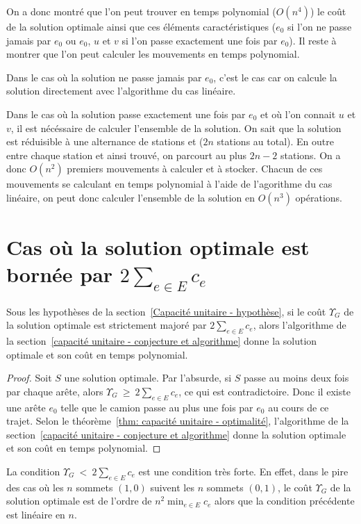 On a donc montré que l'on peut trouver en temps polynomial ($O(n^4)$) le coût de la solution optimale ainsi que ces éléments caractéristiques ($e_0$ si l'on ne passe jamais par $e_0$ ou $e_0$, $u$ et $v$ si l'on passe exactement une fois par $e_0$). Il reste à montrer que l'on peut calculer les mouvements en temps polynomial.

Dans le cas où la solution ne passe jamais par $e_0$, c'est le cas car on calcule la solution directement avec l'algorithme du cas linéaire.

Dans le cas où la solution passe exactement une fois par $e_0$ et où l'on connait $u$ et $v$, il est nécéssaire de calculer l'ensemble de la solution. On sait que la solution est réduisible à une alternance de stations \plus et \moins ($2n$ stations au total). En outre entre chaque station \plus et \moins ainsi trouvé, on parcourt au plus $2n-2$ stations. On a donc $O(n^2)$ premiers mouvements à calculer et à stocker. Chacun de ces mouvements se calculant en temps polynomial à l'aide de l'agorithme du cas linéaire, on peut donc calculer l'ensemble de la solution en $O(n^3)$ opérations.


\section{Cas où la solution optimale est bornée par $2\sum_{e \in E}c_e$}

\begin{prop}
Sous les hypothèses de la section~\ref{Capacité unitaire - hypothèse}, si le coût $\Upsilon_G$ de la solution optimale est strictement majoré par $2\sum_{e \in E}c_e$, alors l'algorithme de la section~\ref{capacité unitaire - conjecture et algorithme} donne la solution optimale et son coût en temps polynomial.
\end{prop}

\begin{proof}
Soit $S$ une solution optimale. Par l'absurde, si $S$ passe au moins deux fois par chaque arête, alors $\Upsilon_G~\ge~2\sum_{e \in E}c_e$, ce qui est contradictoire. Donc il existe une arête $e_0$ telle que le camion passe au plus une fois par $e_0$ au cours de ce trajet. Selon le théorème~\ref{thm: capacité unitaire - optimalité}, l'algorithme de la section~\ref{capacité unitaire - conjecture et algorithme} donne la solution optimale et son coût en temps polynomial.
\end{proof}

\begin{rmq}
La condition $\Upsilon_G~<~2\sum_{e \in E}c_e$ est une condition très forte. En effet, dans le pire des cas où les $n$ sommets $(1,0)$ suivent les $n$ sommets $(0,1)$, le coût $\Upsilon_G$ de la solution optimale est de l'ordre de $n^2\min_{e \in E}c_e$ alors que la condition précédente est linéaire en $n$.
\end{rmq}